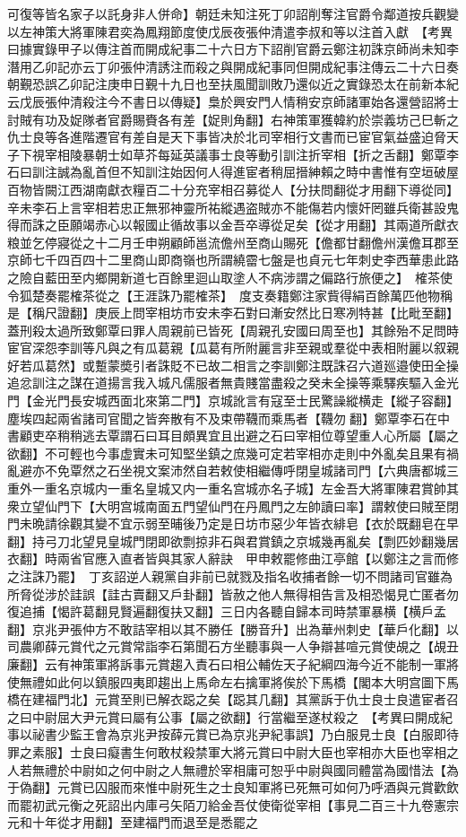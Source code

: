 可復等皆名家子以託身非人併命】朝廷未知注死丁卯詔削奪注官爵令鄰道按兵觀變以左神策大將軍陳君奕為鳳翔節度使戊辰夜張仲清遣李叔和等以注首入獻　【考異曰據實錄甲子以傳注首而開成紀事二十六日方下詔削官爵云鄭注初誅京師尚未知李潛用乙卯記亦云丁卯張仲清誘注而殺之與開成紀事同但開成紀事注傳云二十六日奏朝覲恐誤乙卯記注庚申日覲十九日也至扶風聞訓敗乃還似近之實錄恐太在前新本紀云戊辰張仲清殺注今不書日以傳疑】梟於興安門人情稍安京師諸軍始各還營詔將士討賊有功及娖隊者官爵賜賚各有差【娖則角翻】右神策軍獲韓約於崇義坊己巳斬之仇士良等各進階遷官有差自是天下事皆决於北司宰相行文書而已宦官氣益盛迫脅天子下視宰相陵暴朝士如草芥每延英議事士良等動引訓注折宰相【折之舌翻】鄭覃李石曰訓注誠為亂首但不知訓注始因何人得進宦者稍屈搢紳賴之時中書惟有空垣破屋百物皆闕江西湖南獻衣糧百二十分充宰相召募從人【分扶問翻從才用翻下導從同】辛未李石上言宰相若忠正無邪神靈所祐縱遇盗賊亦不能傷若内懷奸罔雖兵衛甚設鬼得而誅之臣願竭赤心以報國止循故事以金吾卒導從足矣【從才用翻】其兩道所獻衣粮並乞停寢從之十二月壬申朔顧師邕流儋州至商山賜死【儋都甘翻儋州漢儋耳郡至京師七千四百四十二里商山即商嶺也所謂繞霤七盤是也貞元七年刺史李西華患此路之險自藍田至内鄉開新道七百餘里迴山取塗人不病涉謂之偏路行旅便之】　榷茶使令狐楚奏罷榷茶從之【王涯誅乃罷榷茶】　度支奏籍鄭注家貲得絹百餘萬匹他物稱是【稱尺證翻】庚辰上問宰相坊市安未李石對曰漸安然比日寒冽特甚【比毗至翻】蓋刑殺太過所致鄭覃曰罪人周親前已皆死【周親孔安國曰周至也】其餘殆不足問時宦官深怨李訓等凡與之有瓜葛親【瓜葛有所附麗言非至親或羣從中表相附麗以叙親好若瓜葛然】或蹔蒙奬引者誅貶不已故二相言之李訓鄭注既誅召六道廵邉使田全操追忿訓注之謀在道揚言我入城凡儒服者無貴賤當盡殺之癸未全操等乘驛疾驅入金光門【金光門長安城西面北來第二門】京城訛言有寇至士民驚譟縱横走【縱子容翻】塵埃四起兩省諸司官聞之皆奔散有不及束帶韈而乘馬者【韈勿翻】鄭覃李石在中書顧吏卒稍稍逃去覃謂石曰耳目頗異宜且出避之石曰宰相位尊望重人心所屬【屬之欲翻】不可輕也今事虚實未可知堅坐鎮之庶幾可定若宰相亦走則中外亂矣且果有禍亂避亦不免覃然之石坐視文案沛然自若敕使相繼傳呼閉皇城諸司門【六典唐都城三重外一重名京城内一重名皇城又内一重名宫城亦名子城】左金吾大將軍陳君賞帥其衆立望仙門下【大明宫城南面五門望仙門在丹鳳門之左帥讀曰率】謂敕使曰賊至閉門未晩請徐觀其變不宜示弱至晡後乃定是日坊市惡少年皆衣緋皂【衣於既翻皂在早翻】持弓刀北望見皇城門閉即欲剽掠非石與君賞鎮之京城幾再亂矣【剽匹妙翻幾居衣翻】時兩省官應入直者皆與其家人辭訣　甲申敕罷修曲江亭館【以鄭注之言而修之注誅乃罷】　丁亥詔逆人親黨自非前已就戮及指名收捕者餘一切不問諸司官雖為所脅從涉於詿誤【詿古賣翻又戶卦翻】皆赦之他人無得相告言及相恐愒見亡匿者勿復追捕【愒許葛翻見賢遍翻復扶又翻】三日内各聽自歸本司時禁軍暴横【横戶孟翻】京兆尹張仲方不敢詰宰相以其不勝任【勝音升】出為華州刺史【華戶化翻】以司農卿薛元賞代之元賞常詣李石第聞石方坐聽事與一人争辯甚喧元賞使覘之【覘丑廉翻】云有神策軍將訴事元賞趨入責石曰相公輔佐天子紀綱四海今近不能制一軍將使無禮如此何以鎮服四夷即趨出上馬命左右擒軍將俟於下馬橋【閣本大明宫圖下馬橋在建福門北】元賞至則已解衣跽之矣【跽其几翻】其黨訴于仇士良士良遣宦者召之曰中尉屈大尹元賞曰屬有公事【屬之欲翻】行當繼至遂杖殺之　【考異曰開成紀事以祕書少監王會為京兆尹按薛元賞已為京兆尹紀事誤】乃白服見士良【白服即待罪之素服】士良曰癡書生何敢杖殺禁軍大將元賞曰中尉大臣也宰相亦大臣也宰相之人若無禮於中尉如之何中尉之人無禮於宰相庸可恕乎中尉與國同體當為國惜法【為于偽翻】元賞已囚服而來惟中尉死生之士良知軍將已死無可如何乃呼酒與元賞歡飲而罷初武元衡之死詔出内庫弓矢陌刀給金吾仗使衛從宰相【事見二百三十九卷憲宗元和十年從才用翻】至建福門而退至是悉罷之

